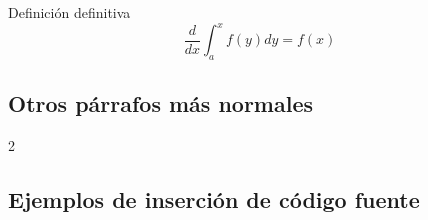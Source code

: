 	\begin{defn}
		Definición definitiva
		$$\frac{d}{dx}\int_a^xf(y)dy=f(x)$$
	\end{defn}

	\lipsum[115]

	\subsection{Otros párrafos más normales}

	\lipsum[7]


	\lipsum[4]

	\begin{multicols}{2}

		\lipsum[4]


		\lipsum[2-3]

	\end{multicols}

\subsection{Ejemplos de inserción de código fuente}

	\newcommand{\insertsrcmanual}[2]{\href{https://template-latex.github.io/informe.html?srctype=#1\#hlp-srccode}{#2}}

